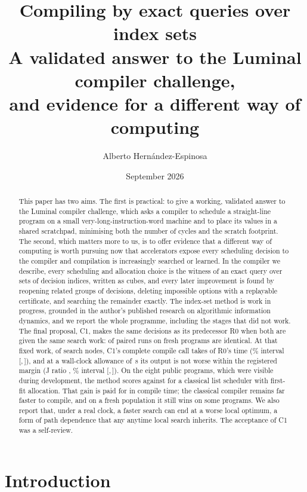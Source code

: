 \documentclass[11pt,a4paper]{article}
\title{Compiling by exact queries over index sets\\[4pt]
\large A validated answer to the Luminal compiler challenge,\\and evidence for a different way of computing}
\author{Alberto Hern\'andez-Espinosa}
\date{September 2026}
\newcommand{\ci}[2]{[#1,\,#2]}
\begin{document}
\maketitle

\begin{abstract}
This paper has two aims. The first is practical: to give a working, validated
answer to the Luminal compiler challenge, which asks a compiler to schedule a
straight-line program on a small very-long-instruction-word machine and to place
its values in a shared scratchpad, minimising both the number of cycles and the
scratch footprint. The second, which matters more to us, is to offer evidence
that a different way of computing is worth pursuing now that accelerators expose
every scheduling decision to the compiler and compilation is increasingly
searched or learned. In the compiler we describe, every scheduling and allocation
choice is the witness of an exact query over sets of decision indices, written as
cubes, and every later improvement is found by reopening related groups of
decisions, deleting impossible options with a replayable certificate, and
searching the remainder exactly. The index-set method is work in progress,
grounded in the author's published research on algorithmic information dynamics,
and we report the whole programme, including the stages that did not work. The final proposal, C1, makes the same decisions as its
predecessor R0 when both are given the same search work:  of
 paired runs on  fresh programs are identical. At
that fixed work, of  search nodes, C1's complete compile call takes
 of R0's time (\% interval \ci{}{}), and at a
wall-clock allowance of \,s its output is not worse within the registered
margin (J ratio , \% interval \ci{}{}). On the
eight public programs, which were visible during development, the method
scores  against  for a classical list scheduler
with first-fit allocation. That gain is paid for in compile time; the classical
compiler remains far faster to compile, and on a fresh population it still wins
on some programs. We also report that, under a real clock, a faster search can end
at a worse local optimum, a form of path dependence that any anytime local search
inherits. The acceptance of C1 was a self-review.
\end{abstract}

\section{Introduction}\label{sec:intro}
\end{document}

